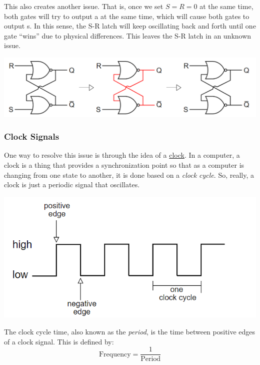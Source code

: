 \documentclass[letterpaper]{article}
\begin{document}
This also creates another issue. That is, once we set $S = R = 0$ at the same time, both  gates will try to output a  at the same time, which will cause both  gates to output s. In this sense, the S-R latch will keep oscillating back and forth until one  gate ``wins'' due to physical differences. This leaves the S-R latch in an unknown issue. 
\begin{center}
    \includegraphics[scale=0.5]{img/sr_bad_2.PNG}
\end{center}

\subsubsection{Clock Signals}
One way to resolve this issue is through the idea of a \underline{clock}. In a computer, a clock is a thing that provides a synchronization point so that as a computer is changing from one state to another, it is done based on a \emph{clock cycle}. So, really, a clock is just a periodic signal that oscillates. 
\begin{center}
    \includegraphics[scale=0.5]{img/clock.PNG}
\end{center}
The clock cycle time, also known as the \emph{period}, is the time between positive edges of a clock signal. This is defined by:
\[\text{Frequency} = \frac{1}{\text{Period}}\]
\end{document}
